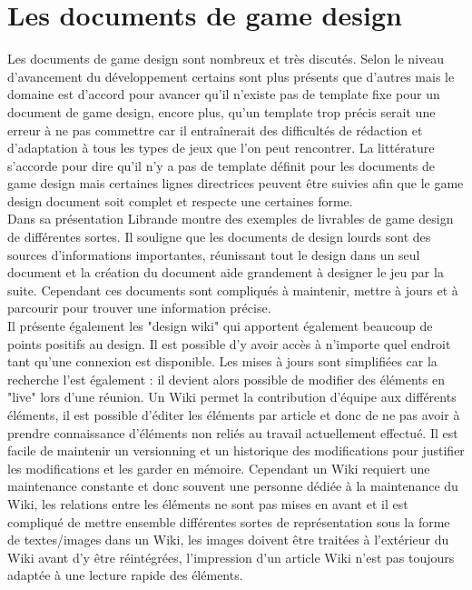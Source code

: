 \chapter{Les documents de game design}

Les documents de game design sont nombreux et très discutés. Selon le niveau d'avancement du développement certains sont plus présents que d'autres mais le domaine est d'accord pour avancer qu'il n'existe pas de template fixe pour un document de game design, encore plus, qu'un template trop précis serait une erreur à ne pas commettre car il entraînerait des difficultés de rédaction et d'adaptation à tous les types de jeux que l'on peut rencontrer. La littérature s'accorde pour dire qu'il n'y a pas de template définit pour les documents de game design mais certaines lignes directrices peuvent être suivies afin que le game design document soit complet et respecte une certaines forme.\\
Dans sa présentation Librande montre des exemples de livrables de game design de différentes sortes. Il souligne que les documents de design lourds sont des sources d'informations importantes, réunissant tout le design dans un seul document et la création du document aide grandement à designer le jeu par la suite. Cependant ces documents sont compliqués à maintenir, mettre à jours et à parcourir pour trouver une information précise.\\
Il présente également les "design wiki" qui apportent également beaucoup de points positifs au design. Il est possible d'y avoir accès à n'importe quel endroit tant qu'une connexion est disponible. Les mises à jours sont simplifiées car la recherche l'est également : il devient alors possible de modifier des éléments en "live" lors d'une réunion. Un Wiki permet la contribution d'équipe aux différents éléments, il est possible d'éditer les éléments par article et donc de ne pas avoir à prendre connaissance d'éléments non reliés au travail actuellement effectué. Il est facile de maintenir un versionning et un historique des modifications pour justifier les modifications et les garder en mémoire. Cependant un Wiki requiert une maintenance constante et donc souvent une personne dédiée à la maintenance du Wiki, les relations entre les éléments ne sont pas mises en avant et il est compliqué de mettre ensemble différentes sortes de représentation sous la forme de textes/images dans un Wiki, les images doivent être traitées à l'extérieur du Wiki avant d'y être réintégrées, l'impression d'un article Wiki n'est pas toujours adaptée à une lecture rapide des éléments.\\



